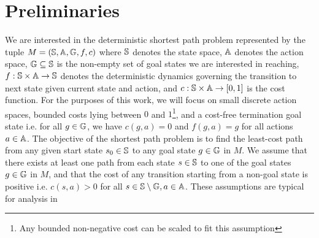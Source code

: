 \section{Preliminaries}
\label{sec:preliminaries}

We are interested in the deterministic shortest path problem
represented by the tuple $M = (\mathbb{S}, \mathbb{A}, \mathbb{G},
f, c)$ where $\mathbb{S}$ denotes the state space, $\mathbb{A}$
denotes the action space, $\mathbb{G} \subseteq \mathbb{S}$ is the
non-empty set of goal states we are
interested in reaching, $f: \mathbb{S} \times \mathbb{A}
\rightarrow \mathbb{S}$ denotes the deterministic dynamics governing
the transition to next state given current state and action, and $c:
\mathbb{S} \times \mathbb{A} \rightarrow [0, 1]$ is the cost
function. For the purposes of
this work, we will focus on small
discrete action spaces, bounded costs lying between $0$ and
$1$\footnote{Any bounded non-negative cost can be scaled to fit
  this assumption}, and a cost-free termination goal state i.e. for
all $g \in \mathbb{G}$, we have
$c(g, a) = 0$
and $f(g, a) = g$ for all actions $a \in \mathbb{A}$.
The objective of the shortest path problem is to find the least-cost path from any given start state $s_{0}
\in \mathbb{S}$ to any goal state $g \in \mathbb{G}$
in $M$.
We assume that there
exists at least one path from each state $s \in
\mathbb{S}$ to one of the goal states $g \in \mathbb{G}$ in $M$, and
that the
cost of any transition starting from a non-goal state is positive i.e. $c(s, a)
> 0$ for all $s \in \mathbb{S} \setminus \mathbb{G}, a \in
\mathbb{A}$. These assumptions are typical for analysis in
